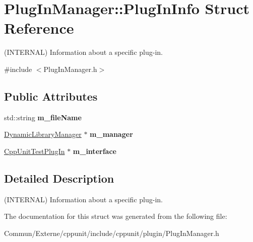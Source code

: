 \hypertarget{struct_plug_in_manager_1_1_plug_in_info}{}\section{Plug\+In\+Manager\+:\+:Plug\+In\+Info Struct Reference}
\label{struct_plug_in_manager_1_1_plug_in_info}


(I\+N\+T\+E\+R\+N\+AL) Information about a specific plug-\/in.  




{\ttfamily \#include $<$Plug\+In\+Manager.\+h$>$}

\subsection*{Public Attributes}
\begin{DoxyCompactItemize}
\item 
std\+::string {\bfseries m\+\_\+file\+Name}\hypertarget{struct_plug_in_manager_1_1_plug_in_info_ac084e2efe4d9953812eff03966c06988}{}\label{struct_plug_in_manager_1_1_plug_in_info_ac084e2efe4d9953812eff03966c06988}

\item 
\hyperlink{class_dynamic_library_manager}{Dynamic\+Library\+Manager} $\ast$ {\bfseries m\+\_\+manager}\hypertarget{struct_plug_in_manager_1_1_plug_in_info_a1889712db485e16a29c45ecba4780f0a}{}\label{struct_plug_in_manager_1_1_plug_in_info_a1889712db485e16a29c45ecba4780f0a}

\item 
\hyperlink{struct_cpp_unit_test_plug_in}{Cpp\+Unit\+Test\+Plug\+In} $\ast$ {\bfseries m\+\_\+interface}\hypertarget{struct_plug_in_manager_1_1_plug_in_info_a306eb58a5d6881b117d6bb9a9ae46589}{}\label{struct_plug_in_manager_1_1_plug_in_info_a306eb58a5d6881b117d6bb9a9ae46589}

\end{DoxyCompactItemize}


\subsection{Detailed Description}
(I\+N\+T\+E\+R\+N\+AL) Information about a specific plug-\/in. 

The documentation for this struct was generated from the following file\+:\begin{DoxyCompactItemize}
\item 
Commun/\+Externe/cppunit/include/cppunit/plugin/Plug\+In\+Manager.\+h\end{DoxyCompactItemize}
